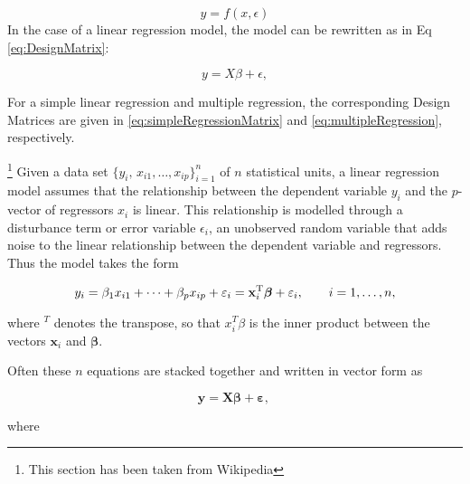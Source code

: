 \begin{equation}
  y =f(x,\epsilon)
\end{equation}
In the case of a linear regression model, the model can be rewritten as in Eq \ref{eq:DesignMatrix}:

\begin{equation*}
    y=X\beta+ \epsilon,
\end{equation*}

For a simple linear regression and multiple regression, the corresponding Design Matrices are given in \ref{eq:simpleRegressionMatrix} and \ref{eq:multipleRegression}, respectively.

\footnote{This section has been taken from Wikipedia} Given a data set $\{y_i,\, x_{i1}, \ldots, x_{ip}\}_{i=1}^n$ of $n$ statistical units, a linear regression model assumes that the relationship between the dependent variable $y_i$ and the $p$-vector of regressors $x_i$ is linear. This relationship is modelled through a disturbance term or error variable $\epsilon_i$, an unobserved random variable that adds noise to the linear relationship between the dependent variable and regressors. Thus the model takes the form

\begin{equation}\label{eq:regression}
   y_i = \beta_1   x_{i1} + \cdots + \beta_p x_{ip} + \varepsilon_i
   = \mathbf{x}^{\rm T}_i\boldsymbol\beta + \varepsilon_i,
   \qquad i = 1, \ldots, n,
\end{equation}

where $^T$ denotes the transpose, so that $x_i^T\beta$ is the inner product between the vectors $\mathbf{x}_i$ and $\boldsymbol\beta$.

Often these $n$ equations are stacked together and written in vector form as

\begin{equation}
  \mathbf{y} = \mathbf{X}\boldsymbol\beta + \boldsymbol\varepsilon, \,
\end{equation}

where

